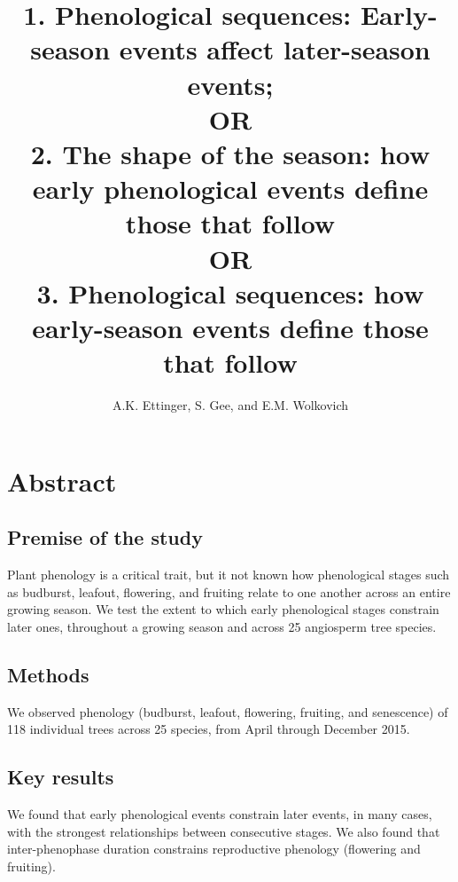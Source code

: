 \documentclass{article}
\begin{document}

\title{1. Phenological sequences: Early-season events affect later-season events; \\ OR \\
2. The shape of the season: how early phenological events define those that follow \\ OR\\
3. Phenological sequences: how early-season events define those that follow} %
\author{A.K. Ettinger, S. Gee, and E.M. Wolkovich}
\maketitle  %


\section*{Abstract}
\subsection*{Premise of the study}
Plant phenology is a critical trait, but it not known how phenological stages such as budburst, leafout, flowering, and fruiting relate to one another across an entire growing season. We test the extent to which early phenological stages constrain later ones, throughout a growing season and across 25 angiosperm tree species. 
\subsection*{Methods}
We observed phenology (budburst, leafout, flowering, fruiting, and senescence) of 118 individual trees across 25 species, from April through December 2015. 
\subsection*{Key results}
We found that early phenological events constrain later events, in many cases, with the strongest relationships between consecutive stages. We also found that inter-phenophase duration constrains reproductive phenology (flowering and fruiting).
\end{document}
